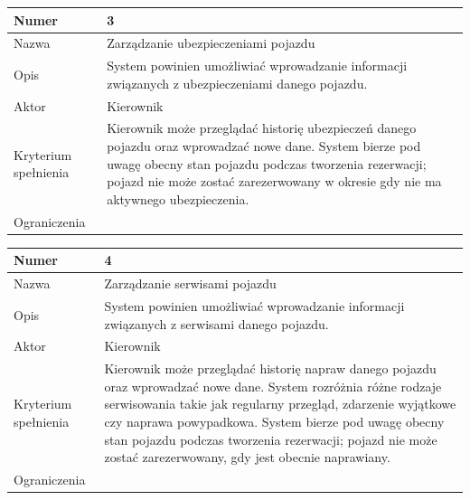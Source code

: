 \documentclass[eng,printmode,openany]{mgr}
\begin{document}
	\begin{table}[H]
		\begin{tabularx}{\textwidth}{|l|X|}
			\hline
			Numer                & 3 \\ \hline
			Nazwa                & Zarządzanie ubezpieczeniami pojazdu \\ \hline
			Opis                 & System powinien umożliwiać wprowadzanie informacji związanych z ubezpieczeniami danego pojazdu. \\ \hline
			Aktor                & Kierownik \\ \hline
			Kryterium spełnienia & Kierownik może przeglądać historię ubezpieczeń danego pojazdu oraz wprowadzać nowe dane. System bierze pod uwagę obecny stan pojazdu podczas tworzenia rezerwacji;  pojazd nie może zostać zarezerwowany w okresie gdy nie ma aktywnego ubezpieczenia. \\ \hline
			Ograniczenia         & \\ \hline
		\end{tabularx}
	\end{table}
	
	\begin{table}[H]
		\begin{tabularx}{\textwidth}{|l|X|}
			\hline
			Numer                & 4 \\ \hline
			Nazwa                & Zarządzanie serwisami pojazdu \\ \hline
			Opis                 & System powinien umożliwiać wprowadzanie informacji związanych z serwisami danego pojazdu. \\ \hline
			Aktor                & Kierownik \\ \hline
			Kryterium spełnienia & Kierownik może przeglądać historię napraw danego pojazdu oraz wprowadzać nowe dane. System rozróżnia różne rodzaje serwisowania takie jak regularny przegląd, zdarzenie wyjątkowe czy naprawa powypadkowa. System bierze pod uwagę obecny stan pojazdu podczas tworzenia rezerwacji; pojazd nie może zostać zarezerwowany, gdy jest obecnie naprawiany. \\ \hline
			Ograniczenia         & \\ \hline
		\end{tabularx}
	\end{table}
	
\end{document}
